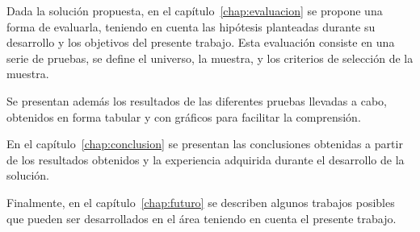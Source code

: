 
Dada la solución propuesta, en el capítulo~\ref{chap:evaluacion} se propone una
forma de evaluarla, teniendo en cuenta las hipótesis planteadas durante su
desarrollo  y los objetivos del presente trabajo. Esta evaluación consiste en
una serie de pruebas, se define el universo, la muestra, y los criterios de
selección de la muestra.


Se presentan además los resultados de las diferentes
pruebas llevadas a cabo, obtenidos en forma tabular y con gráficos para
facilitar la comprensión. %


En el capítulo~\ref{chap:conclusion} se presentan las
conclusiones obtenidas a partir de los resultados obtenidos y la experiencia
adquirida durante el desarrollo de la solución.


Finalmente, en el capítulo~\ref{chap:futuro} se describen algunos trabajos posibles que pueden
ser desarrollados en el área teniendo en cuenta el presente trabajo. 

